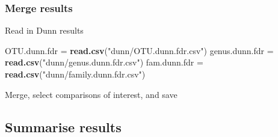 \documentclass[]{article}
\newenvironment{Shaded}{\begin{snugshade}}{\end{snugshade}}
\newcommand{\KeywordTok}[1]{\textcolor[rgb]{0.13,0.29,0.53}{\textbf{#1}}}
\newcommand{\DataTypeTok}[1]{\textcolor[rgb]{0.13,0.29,0.53}{#1}}
\newcommand{\StringTok}[1]{\textcolor[rgb]{0.31,0.60,0.02}{#1}}
\newcommand{\OtherTok}[1]{\textcolor[rgb]{0.56,0.35,0.01}{#1}}
\newcommand{\OperatorTok}[1]{\textcolor[rgb]{0.81,0.36,0.00}{\textbf{#1}}}
\newcommand{\NormalTok}[1]{#1}
\begin{document}
\subsubsection{Merge results}\label{merge-results-2}

Read in Dunn results

\begin{Shaded}
\begin{Highlighting}[]
\NormalTok{OTU.dunn.fdr =}\StringTok{ }\KeywordTok{read.csv}\NormalTok{(}\StringTok{"dunn/OTU.dunn.fdr.csv"}\NormalTok{)}
\NormalTok{genus.dunn.fdr =}\StringTok{ }\KeywordTok{read.csv}\NormalTok{(}\StringTok{"dunn/genus.dunn.fdr.csv"}\NormalTok{)}
\NormalTok{fam.dunn.fdr =}\StringTok{ }\KeywordTok{read.csv}\NormalTok{(}\StringTok{"dunn/family.dunn.fdr.csv"}\NormalTok{)}
\end{Highlighting}
\end{Shaded}

Merge, select comparisons of interest, and save

\begin{Shaded}
\end{Shaded}

\subsection{Summarise results}\label{summarise-results}
\end{document}
